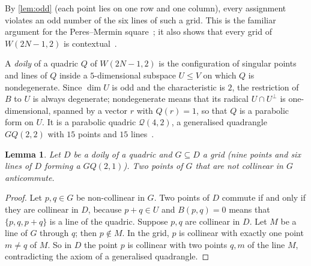 \documentclass[11pt]{article}
\newtheorem{lemma}[lemma]{Lemma}
\theoremstyle{definition}
\theoremstyle{remark}
\begin{document}
By \cref{lem:odd} (each point lies on one row and one column), every assignment violates an odd number of the six lines of such a grid.
This is the familiar argument for the Peres--Mermin square~\cite{Peres90,Mermin90}; it also shows that every grid of $W(2N-1,2)$ is contextual~\cite{Holweck17}.

A \emph{doily} of a quadric $Q$ of $W(2N-1,2)$ is the configuration of singular points and lines of $Q$ inside a $5$-dimensional subspace $U\le V$ on which $Q$ is nondegenerate. Since $\dim U$ is odd and the characteristic is $2$, the restriction of $B$ to $U$ is always degenerate; nondegenerate means that its radical $U\cap U^\perp$ is one-dimensional, spanned by a vector $r$ with $Q(r)=1$, so that $Q$ is a parabolic form on $U$.
It is a parabolic quadric $\mathcal Q(4,2)$, a generalised quadrangle $GQ(2,2)$ with $15$ points and $15$ lines~\cite{PayneThas09,HirschfeldThas16}.

\begin{lemma}\label{lem:collinear}
Let $D$ be a doily of a quadric and $G\subseteq D$ a grid (nine points and six lines of $D$ forming a $GQ(2,1)$). Two points of $G$ that are not collinear in $G$ anticommute.
\end{lemma}
\begin{proof}
Let $p,q\in G$ be non-collinear in $G$.
Two points of $D$ commute if and only if they are collinear in $D$, because $p+q\in U$ and $B(p,q)=0$ means that $\{p,q,p+q\}$ is a line of the quadric.
Suppose $p,q$ are collinear in $D$.
Let $M$ be a line of $G$ through $q$; then $p\notin M$.
In the grid, $p$ is collinear with exactly one point $m\ne q$ of $M$.
So in $D$ the point $p$ is collinear with two points $q,m$ of the line $M$, contradicting the axiom of a generalised quadrangle.
\end{proof}
\end{document}
